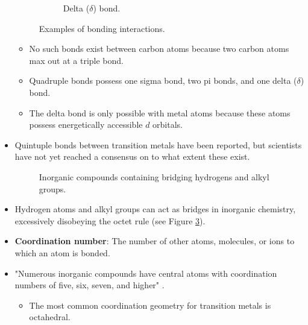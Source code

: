 \documentclass[../notes.tex]{subfiles}
\begin{document}
\begin{itemize}
\begin{figure}[h!]
\begin{subfigure}[b]{0.3\linewidth}
            \caption{Delta ($\delta$) bond.}
            \label{fig:sigmaPiDeltac}
        \end{subfigure}
        \caption{Examples of bonding interactions.}
        \label{fig:sigmaPiDelta}
    \end{figure}
    \begin{itemize}
        \item No such bonds exist between carbon atoms because two carbon atoms max out at a triple bond.
        \item Quadruple bonds possess one sigma bond, two pi bonds, and one delta ($\delta$) bond.
        \item The delta bond is only possible with metal atoms because these atoms possess energetically accessible $d$ orbitals.
    \end{itemize}
    \item Quintuple bonds between transition metals have been reported, but scientists have not yet reached a consensus on to what extent these exist.
    \begin{figure}[h!]
        \centering
        \footnotesize
        \hspace{5em}
        \caption{Inorganic compounds containing bridging hydrogens and alkyl groups.}
        \label{fig:bridgingH-CH3}
    \end{figure}
    \item Hydrogen atoms and alkyl groups can act as bridges in inorganic chemistry, excessively disobeying the octet rule (see Figure \ref{fig:bridgingH-CH3}).
    \item \textbf{Coordination number}: The number of other atoms, molecules, or ions to which an atom is bonded.
    \item "Numerous inorganic compounds have central atoms with coordination numbers of five, six, seven, and higher" \parencite[2]{bib:MiesslerFischerTarr}.
    \begin{itemize}
        \item The most common coordination geometry for transition metals is octahedral.

\end{itemize}
\end{itemize}
\end{document}
